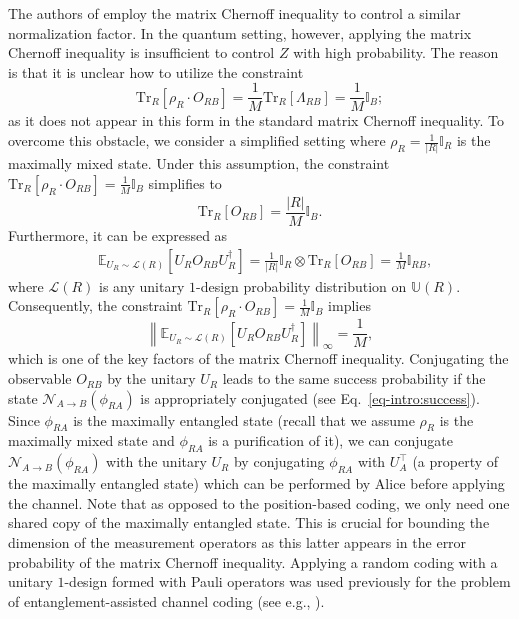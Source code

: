 \documentclass[a4paper,onecolumn,11pt,accepted=2025-10-01]{quantumarticle}
\newcommand*{\dI}{\mathbb{I}}
\newcommand*{\cN}{\mathcal{N}}
\newcommand*{\cL}{\mathcal{L}}
\newcommand*{\ptr}[2]{\mathrm{Tr}_{#1}\left[#2\right]}
\newcommand*{\exs}[2]{\mathbb{E}_{#1}\left[#2 \right]}
\begin{document}
The authors of \cite{Fawzi19} employ the matrix Chernoff inequality \cite{Tropp2015May} to control a similar normalization factor. In the quantum setting, however, applying the matrix Chernoff inequality is insufficient to control $Z$  with high probability. The reason is that it is unclear how to utilize the constraint
\begin{equation}
     \ptr{R}{\rho_R \cdot O_{RB}} = \frac{1}{M}\ptr{R}{ \Lambda_{RB}} = \frac{1}{M}\dI_B;
\end{equation}
as it does not appear in this form in the standard matrix Chernoff inequality. To overcome this obstacle, we consider a simplified setting where $\rho_R = \frac{1}{|R|}\dI_R$ is the maximally mixed state. Under this assumption, the constraint
$\ptr{R}{\rho_R \cdot O_{RB}} = \frac{1}{M}\dI_B$ simplifies to
\begin{equation}
    \ptr{R}{O_{RB}} = \frac{|R|}{M}\dI_B.
\end{equation}
Furthermore, it can be expressed as
\begin{align}
    &\exs{U_R\sim \cL(R)}{U_RO_{RB} U_R^{\dagger }} 
    = \frac{1}{|R|}\dI_R\otimes \ptr{R}{O_{RB}}
    =\frac{1}{M}\dI_{RB},
\end{align}
\sloppy where $\cL(R)$ is any unitary $1$-design probability distribution on $\mathbb{U}(R)$. Consequently, the constraint $\ptr{R}{\rho_R \cdot O_{RB}} = \frac{1}{M}\dI_B$ implies 
\begin{equation}
    \left\|\exs{U_R\sim \cL(R)}{U_RO_{RB} U_R^{\dagger }} \right\|_{\infty} = \frac{1}{M},
\end{equation}
which is one of the key factors of the matrix Chernoff inequality. Conjugating the observable $O_{RB}$ by the unitary $U_R$ leads to the same success probability if the state $\cN_{A\rightarrow B}(\phi_{RA})$ is appropriately conjugated (see Eq.~\eqref{eq-intro:success}).  Since $\phi_{RA}$ is the maximally entangled state (recall that we assume $\rho_R$ is the maximally mixed state and $\phi_{RA}$ is a purification of it), we can conjugate $\cN_{A\rightarrow B}(\phi_{RA})$ with the unitary $U_R$ by conjugating $\phi_{RA}$ with $U_A^\top $ (a property of the maximally entangled state) which can be performed by Alice before applying the channel. Note that as opposed to the position-based   coding, we only need one shared copy of the maximally entangled state. This is crucial for bounding the dimension of the measurement operators as this latter appears in the error probability of the matrix Chernoff inequality. Applying a random coding with a unitary $1$-design formed with Pauli operators was used previously for the problem of entanglement-assisted channel coding (see e.g., \cite{Hsieh2008Jun,Li2024Jul}).\\
\end{document}
